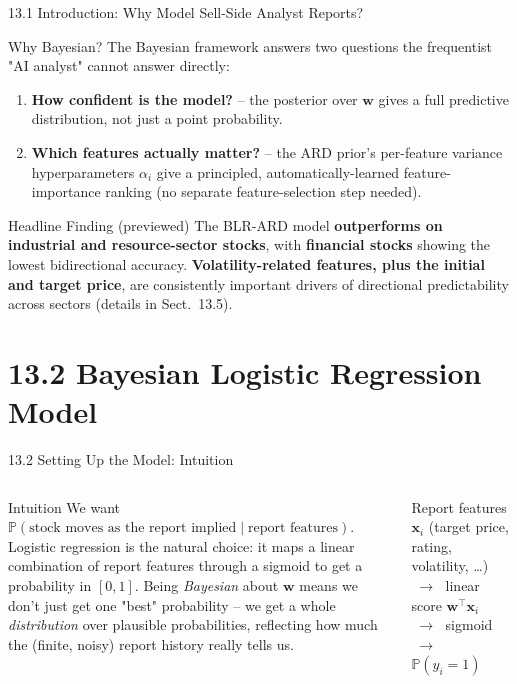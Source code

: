 \documentclass[aspectratio=169,10pt]{beamer}
\renewcommand{\Pr}{\mathbb{P}}
\newcommand{\w}{\mathbf{w}}
\newcommand{\x}{\mathbf{x}}
\begin{document}
\begin{frame}[allowframebreaks]{13.1 \; Introduction: Why Model Sell-Side Analyst Reports?}
\begin{block}{Why Bayesian?}
The Bayesian framework answers two questions the frequentist "AI analyst"
cannot answer directly:
\begin{enumerate}
  \item \textbf{How confident is the model?} -- the posterior over $\w$
        gives a full predictive distribution, not just a point probability.
  \item \textbf{Which features actually matter?} -- the ARD prior's
        per-feature variance hyperparameters $\alpha_i$ give a principled,
        automatically-learned feature-importance ranking (no separate
        feature-selection step needed).
\end{enumerate}
\end{block}

\begin{block}{Headline Finding (previewed)}
The BLR-ARD model \textbf{outperforms on industrial and resource-sector
stocks}, with \textbf{financial stocks} showing the lowest bidirectional
accuracy. \textbf{Volatility-related features, plus the initial and target
price}, are consistently important drivers of directional predictability
across sectors (details in Sect.~13.5).
\end{block}

\end{frame}

\section{13.2 Bayesian Logistic Regression Model}

\begin{frame}{13.2 \; Setting Up the Model: Intuition}
  \begin{columns}
      \begin{block}{Intuition}
        We want $\Pr(\text{stock moves as the report implied} \mid
        \text{report features})$. Logistic regression is the natural choice:
        it maps a linear combination of report features through a sigmoid to
        get a probability in $[0,1]$. Being \emph{Bayesian} about $\w$ means
        we don't just get one "best" probability -- we get a whole
        \emph{distribution} over plausible probabilities, reflecting how much
        the (finite, noisy) report history really tells us.
      \end{block}
      \centering
      {\small Report features $\x_i$ (target price, rating, volatility, \ldots)
      $\;\longrightarrow\;$ linear score $\w^\top\x_i$ $\;\longrightarrow\;$
      sigmoid $\;\longrightarrow\;$ $\Pr(y_i{=}1)$}
  \end{columns}
\end{frame}
\end{document}
